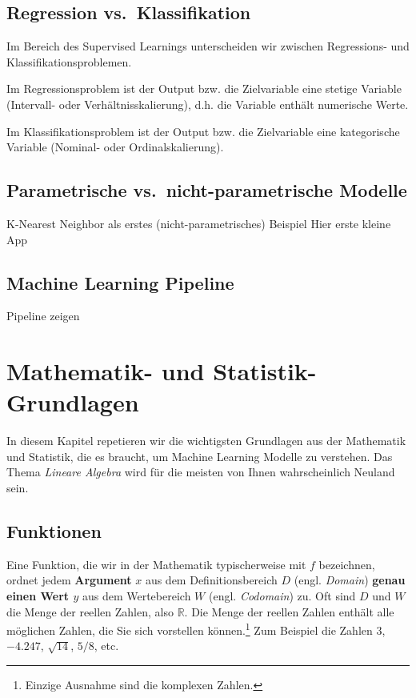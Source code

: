 \documentclass[
]{book}
\begin{document}
\hypertarget{regression-vs.-klassifikation}{%
\section{Regression vs.~Klassifikation}\label{regression-vs.-klassifikation}}

Im Bereich des Supervised Learnings unterscheiden wir zwischen Regressions- und Klassifikationsproblemen.

Im Regressionsproblem ist der Output bzw. die Zielvariable eine stetige Variable (Intervall- oder Verhältnisskalierung), d.h. die Variable enthält numerische Werte.

Im Klassifikationsproblem ist der Output bzw. die Zielvariable eine kategorische Variable (Nominal- oder Ordinalskalierung).

\hypertarget{parametrische-vs.-nicht-parametrische-modelle}{%
\section{Parametrische vs.~nicht-parametrische Modelle}\label{parametrische-vs.-nicht-parametrische-modelle}}

K-Nearest Neighbor als erstes (nicht-parametrisches) Beispiel
Hier erste kleine App

\hypertarget{machine-learning-pipeline}{%
\section{Machine Learning Pipeline}\label{machine-learning-pipeline}}

Pipeline zeigen

\hypertarget{basics}{%
\chapter{Mathematik- und Statistik-Grundlagen}\label{basics}}

In diesem Kapitel repetieren wir die wichtigsten Grundlagen aus der Mathematik und Statistik, die es braucht, um Machine Learning Modelle zu verstehen. Das Thema \emph{Lineare Algebra} wird für die meisten von Ihnen wahrscheinlich Neuland sein.

\hypertarget{funktionen}{%
\section{Funktionen}\label{funktionen}}

Eine Funktion, die wir in der Mathematik typischerweise mit \(f\) bezeichnen, ordnet jedem \textbf{Argument} \(x\) aus dem Definitionsbereich \(D\) (engl. \emph{Domain}) \textbf{genau einen Wert \(y\)} aus dem Wertebereich \(W\) (engl. \emph{Codomain}) zu. Oft sind \(D\) und \(W\) die Menge der reellen Zahlen, also \(\mathbb{R}\). Die Menge der reellen Zahlen enthält alle möglichen Zahlen, die Sie sich vorstellen können.\footnote{Einzige Ausnahme sind die komplexen Zahlen.} Zum Beispiel die Zahlen \(3\), \(-4.247\), \(\sqrt{14}\), \(5/8\), etc.
\end{document}
